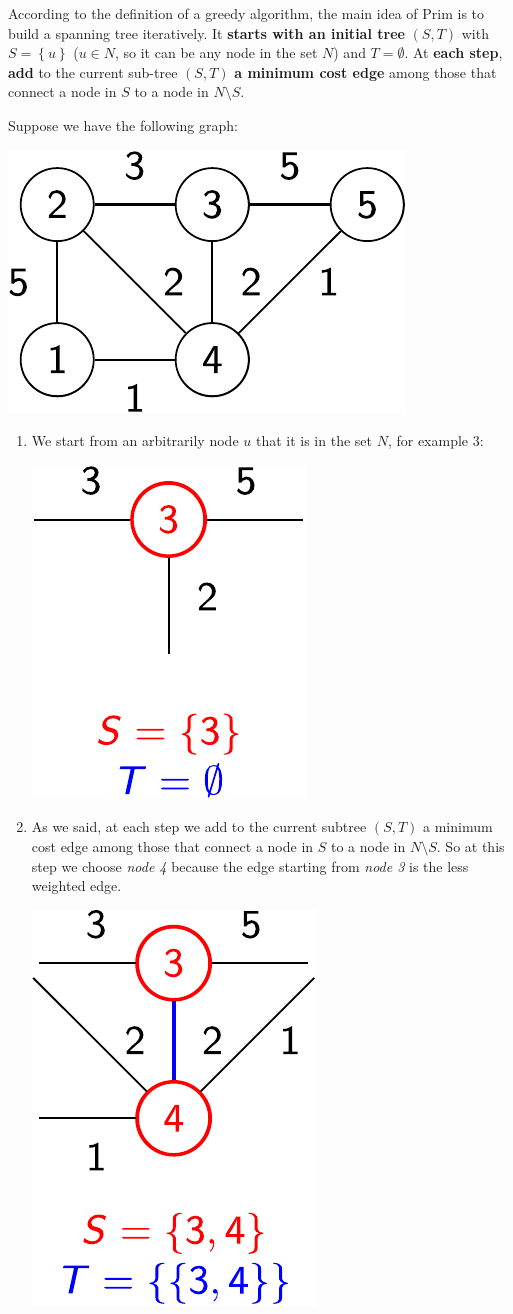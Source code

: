 \highspace
According to the definition of a greedy algorithm, the main idea of Prim is to build a spanning tree iteratively. It \textbf{starts with an initial tree} $\left(S,T\right)$ with $S = \left\{u\right\}$ ($u \in N$, so it can be any node in the set $N$) and $T = \emptyset$. At \textbf{each step}, \textbf{add} to the current sub-tree $\left(S,T\right)$ \textbf{a minimum cost edge} among those that connect a node in $S$ to a node in $N \setminus S$.

\begin{examplebox}
    Suppose we have the following graph:
    \begin{center}
        \includegraphics[width=.3\textwidth]{img/prims-alg-1.pdf}
    \end{center}

    \begin{enumerate}
        \item We start from an arbitrarily node $u$ that it is in the set $N$, for example $3$:
        \begin{center}
            \includegraphics[width=.2\textwidth]{img/prims-alg-2.pdf}
        \end{center}

        \item As we said, at each step we add to the current subtree $\left(S, T\right)$ a minimum cost edge among those that connect a node in $S$ to a node in $N \setminus S$. So at this step we choose \emph{node 4} because the edge starting from \emph{node 3} is the less weighted edge.
        \begin{center}
            \includegraphics[width=.2\textwidth]{img/prims-alg-3.pdf}
        \end{center}


\end{enumerate}
\end{examplebox}
